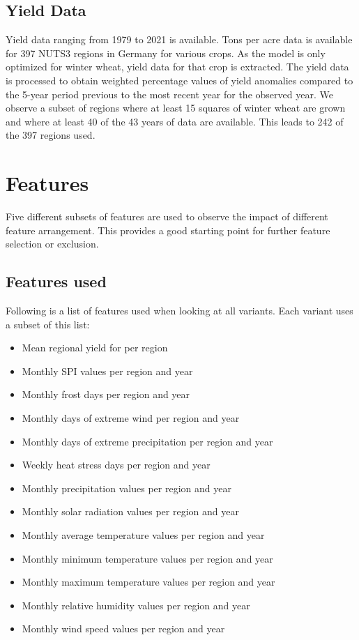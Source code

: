\documentclass{article}
\begin{document}
\subsection{Yield Data}
Yield data ranging from 1979 to 2021 is available. Tons per acre data is available for 397 NUTS3 regions in Germany for various crops. As the model is only optimized for winter wheat, yield data for that crop is extracted. The yield data is processed to obtain weighted percentage values of yield anomalies compared to the 5-year period previous to the most recent year for the observed year. We observe a subset of regions where at least 15 squares of winter wheat are grown and where at least 40 of the 43 years of data are available. This leads to 242 of the 397 regions used.
\section{Features}
Five different subsets of features are used to observe the impact of different feature arrangement. This provides a good starting point for further feature selection or exclusion.
\subsection{Features used}
Following is a list of features used when looking at all variants. Each variant uses a subset of this list:
\begin{itemize}
	\item Mean regional yield for per region
	\item Monthly SPI values per region and year
	\item Monthly frost days per region and year
	\item Monthly days of extreme wind per region and year
	\item Monthly days of extreme precipitation per region and year
	\item Weekly heat stress days per region and year
	\item Monthly precipitation values per region and year
	\item Monthly solar radiation values per region and year
	\item Monthly average temperature values per region and year
	\item Monthly minimum temperature values per region and year
	\item Monthly maximum temperature values per region and year
	\item Monthly relative humidity values per region and year
	\item Monthly wind speed values per region and year
\end{itemize}
\end{document}
